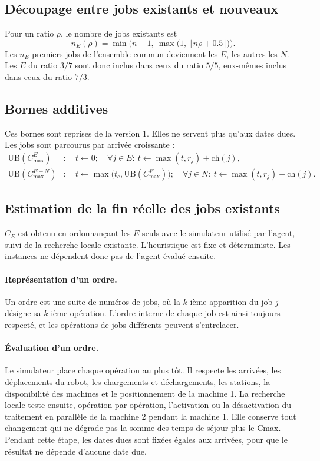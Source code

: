 \documentclass[11pt,a4paper]{article}
\newcommand{\UB}{\mathrm{UB}}
\newcommand{\CE}{C_E}
\newcommand{\charge}{\mathrm{ch}}
\begin{document}
\subsection{Découpage entre jobs existants et nouveaux}
\label{sec:split}

Pour un ratio $\rho$, le nombre de jobs existants est
\[
  n_E(\rho) = \min\!\Big(n-1,\ \max\big(1,\ \lfloor n\rho + 0.5 \rfloor\big)\Big).
\]
Les $n_E$ premiers jobs de l'ensemble commun deviennent les $E$, les autres les $N$.
Les $E$ du ratio $3/7$ sont donc inclus dans ceux du ratio $5/5$, eux-mêmes inclus dans ceux du ratio $7/3$.

\subsection{Bornes additives}
\label{sec:ub}

Ces bornes sont reprises de la version 1. Elles ne servent plus qu'aux dates dues.
Les jobs sont parcourus par arrivée croissante :
\begin{align*}
  \UB(C^E_{\max}) &:\quad t \gets 0;\quad \forall j \in E:\ t \gets \max(t, r_j) + \charge(j), \\
  \UB(C^{E+N}_{\max}) &:\quad t \gets \max\big(t_c, \UB(C^E_{\max})\big);\quad \forall j \in N:\ t \gets \max(t, r_j) + \charge(j).
\end{align*}

\subsection{Estimation de la fin réelle des jobs existants}
\label{sec:heur}

$\CE$ est obtenu en ordonnançant les $E$ seuls avec le simulateur utilisé par l'agent, suivi de la recherche locale existante.
L'heuristique est fixe et déterministe. Les instances ne dépendent donc pas de l'agent évalué ensuite.

\paragraph{Représentation d'un ordre.}
Un ordre est une suite de numéros de jobs, où la $k$-ième apparition du job $j$ désigne sa $k$-ième opération.
L'ordre interne de chaque job est ainsi toujours respecté, et les opérations de jobs différents peuvent s'entrelacer.

\paragraph{Évaluation d'un ordre.}
Le simulateur place chaque opération au plus tôt.
Il respecte les arrivées, les déplacements du robot, les chargements et déchargements, les stations, la disponibilité des machines et le positionnement de la machine 1.
La recherche locale teste ensuite, opération par opération, l'activation ou la désactivation du traitement en parallèle de la machine 2 pendant la machine 1.
Elle conserve tout changement qui ne dégrade pas la somme des temps de séjour plus le Cmax.
Pendant cette étape, les dates dues sont fixées égales aux arrivées, pour que le résultat ne dépende d'aucune date due.
\end{document}

